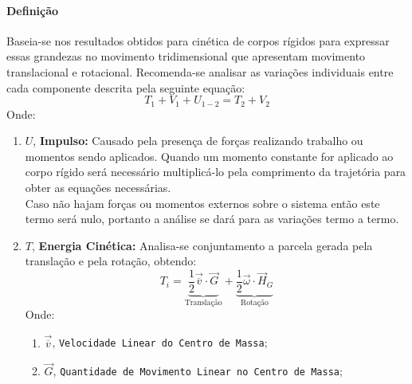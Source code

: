 \documentclass{article}
\begin{document}
            \paragraph{Definição}Baseia-se nos resultados obtidos para cinética de corpos rígidos para expressar essas grandezas no movimento tridimensional que apresentam movimento translacional e rotacional. Recomenda-se analisar as variações individuais entre cada componente descrita pela seguinte equação:
                \begin{equation}
                    \boxed{
                        T_{1} + V_{1} + U_{1-2} = T_{2} + V_{2}
                    }
                \end{equation}
            Onde:
                \begin{enumerate}[rightmargin = \leftmargin]
                    \item $U$, \textbf{Impulso:} Causado pela presença de forças realizando trabalho ou momentos sendo aplicados. Quando um momento constante for aplicado ao corpo rígido será necessário multiplicá-lo pela comprimento da trajetória para obter as equações necessárias.\\
                    Caso não hajam forças ou momentos externos sobre o sistema então este termo será nulo, portanto a análise se dará para as variações termo a termo.

                    \item $T$, \textbf{Energia Cinética:} Analisa-se conjuntamento a parcela gerada pela translação e pela rotação, obtendo:
                        \begin{equation}
                            \boxed{
                                T_{i} = 
                                \underbrace{
                                    \frac{1}{2} \vec{\overline{v}}\cdot\vec{G}
                                }_{\text{Translação}} + 
                                \underbrace{
                                    \frac{1}{2}\vec{\omega}\cdot\vec{H}_{G}
                                }_{\text{Rotação}}
                            }
                        \end{equation}
                    Onde:
                        \begin{enumerate}[rightmargin = \leftmargin, noitemsep]
                            \item $\vec{\overline{v}}$, \texttt{Velocidade Linear do Centro de Massa};

                            \item $\vec{G}$, \texttt{Quantidade de Movimento Linear no Centro de Massa}; \vspace{5mm}


\end{enumerate}
\end{enumerate}
\end{document}
